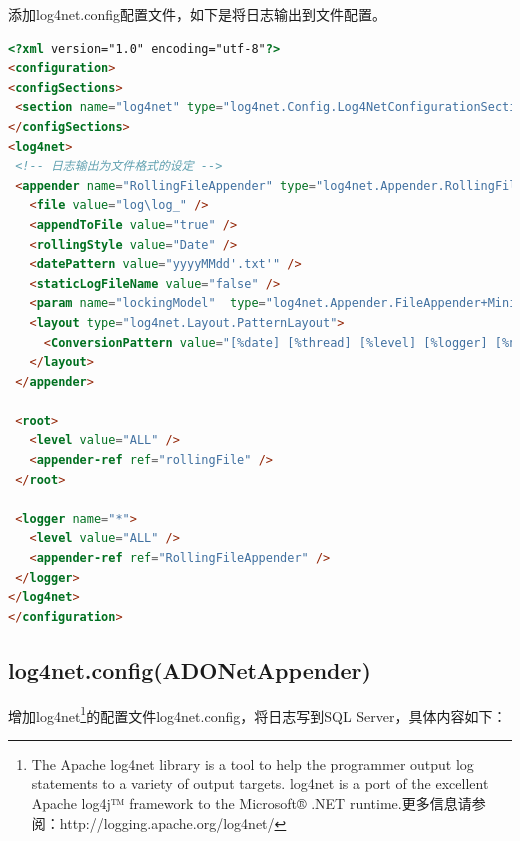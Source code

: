 \documentclass{book}
\begin{document}
添加log4net.config配置文件，如下是将日志输出到文件配置。

\begin{lstlisting}[language=HTML]
<?xml version="1.0" encoding="utf-8"?>
<configuration>
<configSections>
 <section name="log4net" type="log4net.Config.Log4NetConfigurationSectionHandler, log4net"/>
</configSections>
<log4net>
 <!-- 日志输出为文件格式的设定 -->
 <appender name="RollingFileAppender" type="log4net.Appender.RollingFileAppender">
   <file value="log\log_" />
   <appendToFile value="true" />
   <rollingStyle value="Date" />
   <datePattern value="yyyyMMdd'.txt'" />
   <staticLogFileName value="false" />
   <param name="lockingModel"  type="log4net.Appender.FileAppender+MinimalLock" />
   <layout type="log4net.Layout.PatternLayout">
     <ConversionPattern value="[%date] [%thread] [%level] [%logger] [%ndc] - %message%newline" />
   </layout>
 </appender>
 
 <root>
   <level value="ALL" />
   <appender-ref ref="rollingFile" />
 </root>

 <logger name="*">
   <level value="ALL" />
   <appender-ref ref="RollingFileAppender" />
 </logger>
</log4net>
</configuration>	
\end{lstlisting}

\subsection{log4net.config(ADONetAppender)}

增加log4net\footnote{The Apache log4net library is a tool to help the programmer output log statements to a variety of output targets. log4net is a port of the excellent Apache log4j™ framework to the Microsoft® .NET runtime.更多信息请参阅：http://logging.apache.org/log4net/}的配置文件log4net.config，将日志写到SQL Server，具体内容如下：
\end{document}
